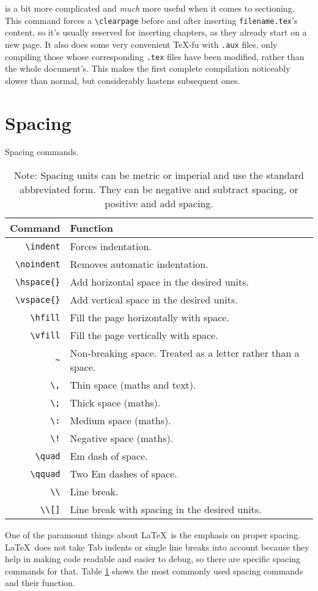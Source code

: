 \verb|| is a bit more complicated and \emph{much} more useful when it comes to sectioning. This command forces a \verb|\clearpage| before and after inserting \texttt{filename.tex}'s content, so it's usually reserved for inserting chapters, as they already start on a new page. It also does some very convenient \TeX-fu with \texttt{.aux} files, only compiling those whose corresponding \texttt{.tex} files have been modified, rather than the whole document's. This makes the first complete compilation noticeably slower than normal, but considerably hastens subsequent ones.
%
\section{Spacing}
%
\begin{table}[!htbp]
    \centering
    \caption{Spacing commands.}
    \label{t:space}
    \begin{tabular}{rl}
        \toprule
        Command & Function \\
        \midrule
        \verb|\indent| & Forces indentation. \\
        \verb|\noindent| & Removes automatic indentation. \\
        \verb|\hspace{}| & Add horizontal space in the desired units. \\
        \verb|\vspace{}| & Add vertical space in the desired units. \\
        \verb|\hfill| & Fill the page horizontally with space. \\
        \verb|\vfill| & Fill the page vertically with space. \\
        \verb|~| & Non-breaking space. Treated as a letter rather than a space. \\
        \verb|\,| & Thin space (maths and text). \\
        \verb|\;| & Thick space (maths). \\
        \verb|\:| & Medium space (maths). \\
        \verb|\!| & Negative space (maths). \\
        \verb|\quad| & Em dash of space. \\
        \verb|\qquad| & Two Em dashes of space. \\
        \verb|\\| & Line break. \\
        \verb|\\[]| & Line break with spacing in the desired units. \\
        \bottomrule
    \end{tabular}
    \vspace{0.1cm}
    \caption*{Note: Spacing units can be metric or imperial and use the standard abbreviated form. They can be negative and subtract spacing, or positive and add spacing.}
\end{table}
One of the paramount things about \LaTeX~is the emphasis on proper spacing. \LaTeX~does not take Tab indents or single line breaks into account because they help in making code readable and easier to debug, so there are specific spacing commands for that. Table \ref{t:space} shows the most commonly used spacing commands and their function.
%
